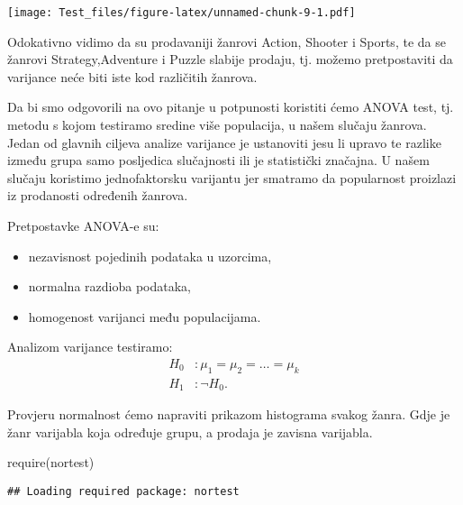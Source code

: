 \documentclass[
]{article}
\newenvironment{Shaded}{\begin{snugshade}}{\end{snugshade}}
\newcommand{\AttributeTok}[1]{\textcolor[rgb]{0.77,0.63,0.00}{#1}}
\newcommand{\CommentTok}[1]{\textcolor[rgb]{0.56,0.35,0.01}{\textit{#1}}}
\newcommand{\FunctionTok}[1]{\textcolor[rgb]{0.00,0.00,0.00}{#1}}
\newcommand{\NormalTok}[1]{#1}
\newcommand{\SpecialCharTok}[1]{\textcolor[rgb]{0.00,0.00,0.00}{#1}}
\newcommand{\StringTok}[1]{\textcolor[rgb]{0.31,0.60,0.02}{#1}}
\providecommand{\tightlist}{%
  \setlength{\itemsep}{0pt}\setlength{\parskip}{0pt}}
\begin{document}
\texttt{[image: Test\_files/figure-latex/unnamed-chunk-9-1.pdf]}

Odokativno vidimo da su prodavaniji žanrovi Action, Shooter i Sports, te
da se žanrovi Strategy,Adventure i Puzzle slabije prodaju, tj. možemo
pretpostaviti da varijance neće biti iste kod različitih žanrova.

Da bi smo odgovorili na ovo pitanje u potpunosti koristiti ćemo ANOVA
test, tj. metodu s kojom testiramo sredine više populacija, u našem
slučaju žanrova. Jedan od glavnih ciljeva analize varijance je
ustanoviti jesu li upravo te razlike između grupa samo posljedica
slučajnosti ili je statistički značajna. U našem slučaju koristimo
jednofaktorsku varijantu jer smatramo da popularnost proizlazi iz
prodanosti određenih žanrova.

Pretpostavke ANOVA-e su:

\begin{itemize}
\tightlist
\item
  nezavisnost pojedinih podataka u uzorcima,
\item
  normalna razdioba podataka,
\item
  homogenost varijanci među populacijama.
\end{itemize}

Analizom varijance testiramo: \[ \begin{aligned}
  H_0 & : \mu_1 = \mu_2 = \ldots = \mu_k \\
  H_1 & : \neg H_0.
\end{aligned} \]

Provjeru normalnost ćemo napraviti prikazom histograma svakog žanra.
Gdje je žanr varijabla koja određuje grupu, a prodaja je zavisna
varijabla.

\begin{Shaded}
\begin{Highlighting}[]
\FunctionTok{require}\NormalTok{(nortest)}
\end{Highlighting}
\end{Shaded}

\begin{verbatim}
## Loading required package: nortest
\end{verbatim}

\begin{Shaded}
\end{Shaded}
\end{document}
